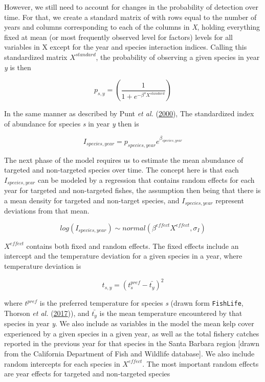 \documentclass[twoside,12pt,final]{ucthesis-CA2012}
\begin{document}
\begin{ucmainmatter}
However, we still need to account for changes in the probability of
detection over time. For that, we create a standard matrix of with rows
equal to the number of years and columns corresponding to each of the
columns in \emph{X}, holding everything fixed at mean (or most
frequently observed level for factors) levels for all variables in X
except for the year and species interaction indices. Calling this
standardized matrix \(X^{standard}\), the probability of observing a
given species in year \emph{y} is then

\[p_{s,y} = (\frac{1}{1 +e^{-\beta^{o}{X^{standard}}}})\]

In the same manner as described by Punt \emph{et al.}
(\protect\hyperlink{ref-Punt2000}{2000}), The standardized index of
abundance for species \emph{s} in year \emph{y} then is

\[I_{species,year} = p_{species,year}e^{\beta_{species,year}}\]

The next phase of the model requires us to estimate the mean abundance
of targeted and non-targeted species over time. The concept here is that
each \(I_{species,year}\) can be modeled by a regression that contains
random effects for each year for targeted and non-targeted fishes, the
assumption then being that there is a mean density for targeted and
non-target species, and \(I_{species,year}\) represent deviations from
that mean.

\[log(I_{species,year}) \sim normal(\beta^{effect}X^{effect}, \sigma_I)\]

\(X^{effect}\) contains both fixed and random effects. The fixed effects
include an intercept and the temperature deviation for a given species
in a year, where temperature deviation is

\[t_{s,y} = (t^{pref}_{s} -  \bar{t_{y}})^2\]

where \(t^{pref}\) is the preferred temperature for species \emph{s}
(drawn form \texttt{FishLife}, Thorson \emph{et al.}
(\protect\hyperlink{ref-Thorson2017d}{2017})), and \(\bar{t_{y}}\) is
the mean temperature encountered by that species in year \emph{y}. We
also include as variables in the model the mean kelp cover experienced
by a given species in a given year, as well as the total fishery catches
reported in the previous year for that species in the Santa Barbara
region {[}drawn from the California Department of Fish and Wildlife
database{]}. We also include random intercepts for each species in
\(X^{effect}\). The most important random effects are year effects for
targeted and non-targeted species


\end{ucmainmatter}
\end{document}
